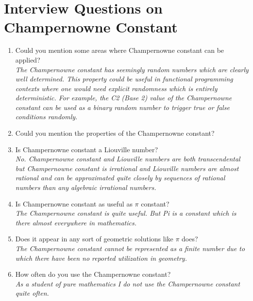\documentclass[12pt, a4paper]{report}
\begin{document}
\section{Interview Questions on Champernowne Constant}
\begin{enumerate}
	\item Could you mention some areas where Champernowne constant can be applied?
	\\ {\it The Champernowne constant has seemingly random numbers which are clearly well determined. This property could be useful in functional programming contexts where one would need explicit randomness which is entirely deterministic. For example, the C2 (Base 2) value of the Champernowne constant can be used as a binary random number to trigger true or false conditions randomly.}
	\item Could you mention the properties of the Champernowne constant?
	\item Is Champernowne constant a Liouville number?
	\\ {\it No. Champernowne constant and Liouville numbers are both transcendental but Champernowne constant is irrational and Liouville numbers are almost rational and can be approximated quite closely by sequences of rational numbers than any algebraic irrational numbers.}
	\item Is Champernowne constant as useful as  \( \pi \) constant?
	\\ {\it The Champernowne constant is quite useful. But Pi is a constant which is there almost everywhere in mathematics. }
	\item Does it appear in any sort of geometric solutions like  \( \pi \) does?
	\\ {\it The Champernowne constant cannot be represented as a finite number due to which there have been no reported utilization in geometry.}
	\item How often do you use the Champernowne constant?
	\\ {\it As a student of pure mathematics I do not use the Champernowne constant quite often.}

\end{enumerate}
\end{document}
